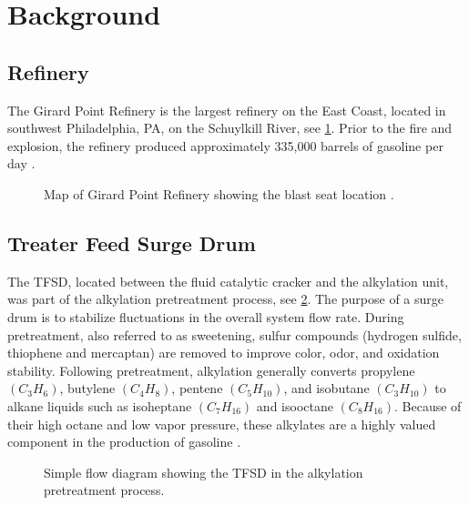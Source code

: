 \documentclass[10pt,parskip=half,
toc=sectionentrywithdots,
bibliography=totocnumbered,
captions=tableheading,numbers=noendperiod]{scrartcl}
\begin{document}
\hypertarget{background}{%
\section{Background}\label{background}}

\hypertarget{refinery}{%
\subsection{Refinery}\label{refinery}}

The Girard Point Refinery is the largest refinery on the East Coast,
located in southwest Philadelphia, PA, on the Schuylkill River, see
\cref{fig:map}. Prior to the fire and explosion, the refinery produced
approximately 335,000 barrels of gasoline per day
\cite{AssociatedPress2019}.

\begin{figure}[H]
\hypertarget{fig:map}{%
\begin{center}
\end{center}
\caption{Map of Girard Point Refinery showing the blast seat location
\cite{Duchneskie2019}.}\label{fig:map}
}
\end{figure}

\hypertarget{treater-feed-surge-drum}{%
\subsection{Treater Feed Surge Drum}\label{treater-feed-surge-drum}}

The TFSD, located between the fluid catalytic cracker and the alkylation
unit, was part of the alkylation pretreatment process, see
\cref{fig:fig_pf}. The purpose of a surge drum is to stabilize
fluctuations in the overall system flow rate. During pretreatment, also
referred to as sweetening, sulfur compounds (hydrogen sulfide, thiophene
and mercaptan) are removed to improve color, odor, and oxidation
stability. Following pretreatment, alkylation generally converts
propylene \((C_3H_6)\), butylene \((C_4H_8)\), pentene \((C_5H_{10})\),
and isobutane \((C_3H_{10})\) to alkane liquids such as isoheptane
\((C_7H_{16})\) and isooctane \((C_8H_{16})\). Because of their high
octane and low vapor pressure, these alkylates are a highly valued
component in the production of gasoline \cite{flowserve2000}.

\begin{figure}[H]
\hypertarget{fig:fig_pf}{%
\begin{center}
\end{center}
\caption{Simple flow diagram showing the TFSD in the alkylation pretreatment
process\cite{Temur2014,Malone2019}.}\label{fig:fig_pf}
}
\end{figure}
\end{document}
